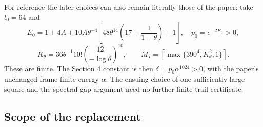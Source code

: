 For reference the later choices can also remain literally
those of the paper: take $l_0=64$ and
\[
 E_0=1+4A+10A\theta^{-4}
       \left[48\theta^{14}\left(17+\frac1{1-\theta}\right)+1\right],
 \quad p_0=e^{-2E_0}>0,
\]
\[
 K_\theta=36\theta^{-1}10!\left(\frac{12}{-\log\theta}\right)^{10},
 \qquad M_\star=\left\lceil\max\{390^4,K_\theta^2,1\}\right\rceil.
\]
These are finite.  The Section 4 constant is then
$\delta=p_0\alpha^{1024}>0$, with the paper's unchanged
frame finite-energy $\alpha$.  The ensuing choice of one
sufficiently large square and the spectral-gap argument need
no further finite trail certificate.

\subsection{Scope of the replacement}

